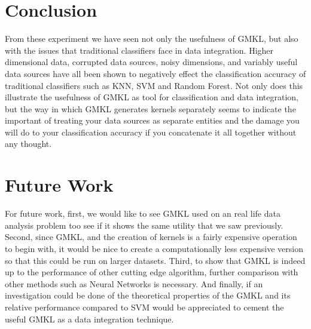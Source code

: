\documentclass{article}
\begin{document}
\section*{Conclusion}
From these experiment we have seen not only the usefulness of GMKL, but also with the issues that traditional classifiers face in data integration. Higher dimensional data, corrupted data sources, noisy dimensions, and variably useful data sources have all been shown to negatively effect the classification accuracy of traditional classifiers such as KNN, SVM and Random Forest. Not only does this illustrate the usefulness of GMKL as tool for classification and data integration, but the way in which GMKL generates kernels separately seems to indicate the important of treating your data sources as separate entities and the damage you will do to your classification accuracy if you concatenate it all together without any thought.


\section*{Future Work}
For future work, first, we would like to see GMKL used on an real life data analysis problem too see if it shows the same utility that we saw previously. Second, since GMKL, and the creation of kernels is a fairly expensive operation to begin with, it would be nice to create a computationally less expensive version so that this could be run on larger datasets. Third, to show that GMKL is indeed up to the performance of other cutting edge algorithm, further comparison with other methods such as Neural Networks is necessary. And finally, if an investigation could be done of the theoretical properties of the GMKL and its relative performance compared to SVM would be appreciated to cement the useful GMKL as a data integration technique.
\end{document}
